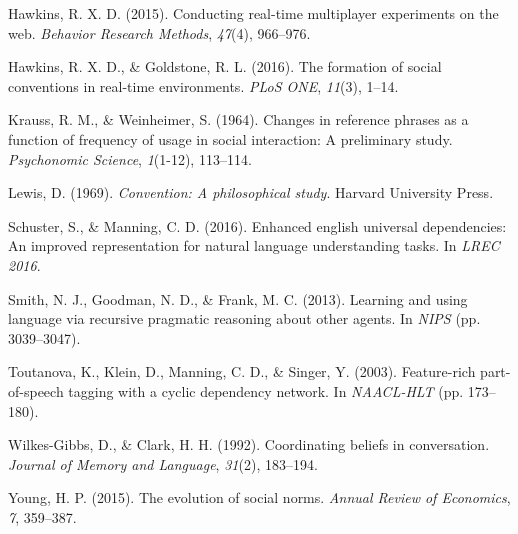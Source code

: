 \documentclass[10pt, letterpaper]{article}
\begin{document}
\hypertarget{ref-Hawkins15_RealTimeWebExperiments}{}
Hawkins, R. X. D. (2015). Conducting real-time multiplayer experiments
on the web. \emph{Behavior Research Methods}, \emph{47}(4), 966--976.

\hypertarget{ref-HawkinsGoldstone16_SocialConventions}{}
Hawkins, R. X. D., \& Goldstone, R. L. (2016). The formation of social
conventions in real-time environments. \emph{PLoS ONE}, \emph{11}(3),
1--14.

\hypertarget{ref-KraussWeinheimer64_ReferencePhrases}{}
Krauss, R. M., \& Weinheimer, S. (1964). Changes in reference phrases as
a function of frequency of usage in social interaction: A preliminary
study. \emph{Psychonomic Science}, \emph{1}(1-12), 113--114.

\hypertarget{ref-Lewis69_Convention}{}
Lewis, D. (1969). \emph{Convention: A philosophical study}. Harvard
University Press.

\hypertarget{ref-SchusterManning16}{}
Schuster, S., \& Manning, C. D. (2016). Enhanced english universal
dependencies: An improved representation for natural language
understanding tasks. In \emph{LREC 2016}.

\hypertarget{ref-SmithGoodmanFrank13_RecursivePragmaticReasoningNIPS}{}
Smith, N. J., Goodman, N. D., \& Frank, M. C. (2013). Learning and using
language via recursive pragmatic reasoning about other agents. In
\emph{NIPS} (pp. 3039--3047).

\hypertarget{ref-Toutanova03_POStagging}{}
Toutanova, K., Klein, D., Manning, C. D., \& Singer, Y. (2003).
Feature-rich part-of-speech tagging with a cyclic dependency network. In
\emph{NAACL-HLT} (pp. 173--180).

\hypertarget{ref-WilkesGibbsClark92_CoordinatingBeliefs}{}
Wilkes-Gibbs, D., \& Clark, H. H. (1992). Coordinating beliefs in
conversation. \emph{Journal of Memory and Language}, \emph{31}(2),
183--194.

\hypertarget{ref-Young15_EvolutionOfSocialNorms}{}
Young, H. P. (2015). The evolution of social norms. \emph{Annual Review
of Economics}, \emph{7}, 359--387.
\end{document}
